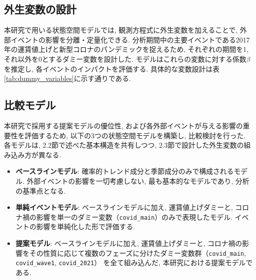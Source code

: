 \documentclass[a4paper, 10pt]{jarticle}
\begin{document}
\subsection{外生変数の設計}
\indent 本研究で用いる状態空間モデルでは, 観測方程式に外生変数を加えることで, 
外部イベントの影響を分離・定量化できる. 分析期間中の主要イベントである2017年の運賃値上げと新型コロナのパンデミックを捉えるため, 
それぞれの期間を1, それ以外を0とするダミー変数を設計した. モデルはこれらの変数に対する係数$\beta$を推定し, 各イベントのインパクトを評価する. 
具体的な変数設計は表\ref{tab:dummy_variables}に示す通りである. 
\begin{table}[htbp]
  \centering
  \caption{外生変数として導入するダミー変数一覧}
  \label{tab:dummy_variables}
  \small
\end{table}

\subsection{比較モデル}
本研究で採用する提案モデルの優位性, および各外部イベントが与える影響の重要性を評価するため, 以下の3つの状態空間モデルを構築し, 比較検討を行った. 
各モデルは, 2.2節で述べた基本構造を共有しつつ, 2.3節で設計した外生変数の組み込み方が異なる. 

\begin{itemize}[noitemsep]
    \item \textbf{ベースラインモデル}: 確率的トレンド成分と季節成分のみで構成されるモデル. 
    外部イベントの影響を一切考慮しない, 最も基本的なモデルであり, 分析の基準点となる. 
    \item \textbf{単純イベントモデル}: ベースラインモデルに加え, 運賃値上げダミーと, 
    コロナ禍の影響を単一のダミー変数（\texttt{covid\_main}）のみで表現したモデル. イベントの影響を単純化した形で評価する. 
    \item \textbf{提案モデル}: ベースラインモデルに加え, 運賃値上げダミーと, 
    コロナ禍の影響をその性質に応じて複数のフェーズに分けたダミー変数群（\texttt{covid\_main}, \texttt{covid\_wave1}, \texttt{covid\_2021}）
    を全て組み込んだ, 本研究における提案モデルである. 
\end{itemize}
\end{document}
